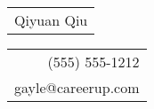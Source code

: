 \documentclass{article}
\begin{document}
\sffamily%
{\Huge\begin{tabular}[c]{l}
  Qiyuan Qiu \\
\end{tabular}}\hfill%
{\small\begin{tabular}[c]{r}
  (555) 555-1212 \\
  gayle@careerup.com
\end{tabular}}%

\bigskip
\end{document}
